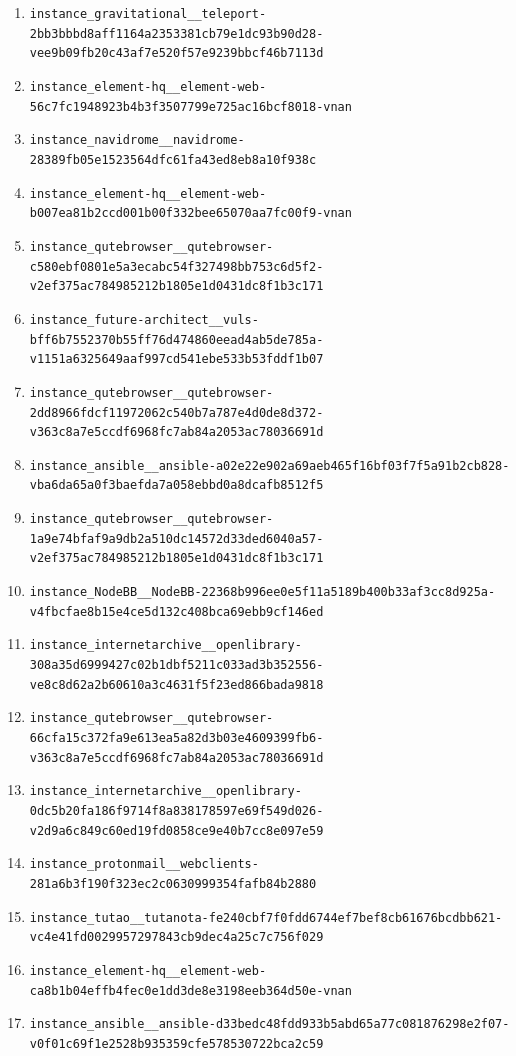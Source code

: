 \documentclass{llmxive}
\begin{document}
\begin{enumerate}
\item \texttt{instance\_gravitational\_\_teleport-2bb3bbbd8aff1164a2353381cb79e1dc93b90d28-vee9b09fb20c43af7e520f57e9239bbcf46b7113d}
\item \texttt{instance\_element-hq\_\_element-web-56c7fc1948923b4b3f3507799e725ac16bcf8018-vnan}
\item \texttt{instance\_navidrome\_\_navidrome-28389fb05e1523564dfc61fa43ed8eb8a10f938c}
\item \texttt{instance\_element-hq\_\_element-web-b007ea81b2ccd001b00f332bee65070aa7fc00f9-vnan}
\item \texttt{instance\_qutebrowser\_\_qutebrowser-c580ebf0801e5a3ecabc54f327498bb753c6d5f2-v2ef375ac784985212b1805e1d0431dc8f1b3c171}
\item \texttt{instance\_future-architect\_\_vuls-bff6b7552370b55ff76d474860eead4ab5de785a-v1151a6325649aaf997cd541ebe533b53fddf1b07}
\item \texttt{instance\_qutebrowser\_\_qutebrowser-2dd8966fdcf11972062c540b7a787e4d0de8d372-v363c8a7e5ccdf6968fc7ab84a2053ac78036691d}
\item \texttt{instance\_ansible\_\_ansible-a02e22e902a69aeb465f16bf03f7f5a91b2cb828-vba6da65a0f3baefda7a058ebbd0a8dcafb8512f5}
\item \texttt{instance\_qutebrowser\_\_qutebrowser-1a9e74bfaf9a9db2a510dc14572d33ded6040a57-v2ef375ac784985212b1805e1d0431dc8f1b3c171}
\item \texttt{instance\_NodeBB\_\_NodeBB-22368b996ee0e5f11a5189b400b33af3cc8d925a-v4fbcfae8b15e4ce5d132c408bca69ebb9cf146ed}
\item \texttt{instance\_internetarchive\_\_openlibrary-308a35d6999427c02b1dbf5211c033ad3b352556-ve8c8d62a2b60610a3c4631f5f23ed866bada9818}
\item \texttt{instance\_qutebrowser\_\_qutebrowser-66cfa15c372fa9e613ea5a82d3b03e4609399fb6-v363c8a7e5ccdf6968fc7ab84a2053ac78036691d}
\item \texttt{instance\_internetarchive\_\_openlibrary-0dc5b20fa186f9714f8a838178597e69f549d026-v2d9a6c849c60ed19fd0858ce9e40b7cc8e097e59}
\item \texttt{instance\_protonmail\_\_webclients-281a6b3f190f323ec2c0630999354fafb84b2880}
\item \texttt{instance\_tutao\_\_tutanota-fe240cbf7f0fdd6744ef7bef8cb61676bcdbb621-vc4e41fd0029957297843cb9dec4a25c7c756f029}
\item \texttt{instance\_element-hq\_\_element-web-ca8b1b04effb4fec0e1dd3de8e3198eeb364d50e-vnan}
\item \texttt{instance\_ansible\_\_ansible-d33bedc48fdd933b5abd65a77c081876298e2f07-v0f01c69f1e2528b935359cfe578530722bca2c59}

\end{enumerate}
\end{document}
